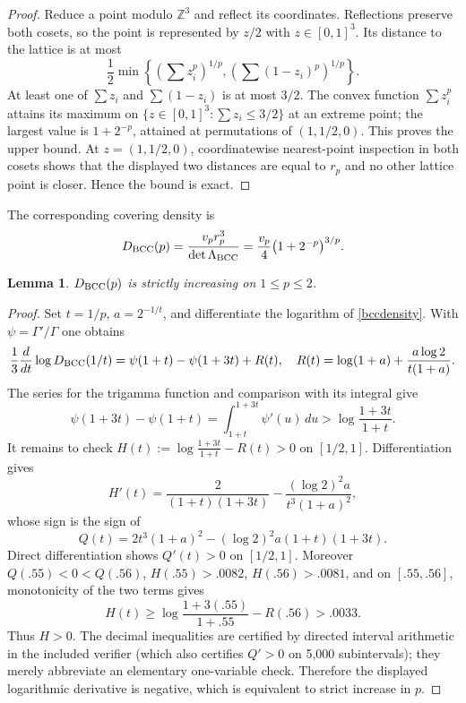 \documentclass[11pt]{article}
\newtheorem*{lemma}{Lemma}
\newcommand{\Z}{\mathbb Z}
\begin{document}
\begin{proof}
Reduce a point modulo $\Z^3$ and reflect its coordinates.  Reflections preserve
both cosets, so the point is represented by $z/2$ with $z\in[0,1]^3$.
Its distance to the lattice is at most
\[
 \frac12\min\left\{
   \left(\sum z_i^p\right)^{1/p},
   \left(\sum(1-z_i)^p\right)^{1/p}
 \right\}.
\]
At least one of $\sum z_i$ and $\sum(1-z_i)$ is at most $3/2$.
The convex function $\sum z_i^p$ attains its maximum on
$\{z\in[0,1]^3:\sum z_i\le3/2\}$ at an extreme point; the largest value is
$1+2^{-p}$, attained at permutations of $(1,1/2,0)$.  This proves the upper
bound.  At $z=(1,1/2,0)$, coordinatewise nearest-point inspection in both
cosets shows that the displayed two distances are equal to $r_p$ and no other
lattice point is closer.  Hence the bound is exact.
\end{proof}

The corresponding covering density is
\begin{equation}\label{bccdensity}
 D_{\rm BCC}(p)
 =\frac{v_pr_p^3}{\det\Lambda_{\rm BCC}}
 =\frac{v_p}{4}\bigl(1+2^{-p}\bigr)^{3/p}.
\end{equation}

\begin{lemma}
$D_{\rm BCC}(p)$ is strictly increasing on $1\le p\le2$.
\end{lemma}

\begin{proof}
Set $t=1/p$, $a=2^{-1/t}$, and differentiate the logarithm of
\eqref{bccdensity}.  With $\psi=\Gamma'/\Gamma$ one obtains
\[
 \frac13\frac{d}{dt}\log D_{\rm BCC}(1/t)
 =\psi(1+t)-\psi(1+3t)+R(t),
\quad
 R(t)=\log(1+a)+\frac{a\log2}{t(1+a)}.
\]
The series for the trigamma function and comparison with its integral give
\[
 \psi(1+3t)-\psi(1+t)
 =\int_{1+t}^{1+3t}\psi'(u)\,du
 >\log\frac{1+3t}{1+t}.
\]
It remains to check $H(t):=\log\frac{1+3t}{1+t}-R(t)>0$ on
$[1/2,1]$.  Differentiation gives
\[
 H'(t)=\frac{2}{(1+t)(1+3t)}
 -\frac{(\log2)^2a}{t^3(1+a)^2},
\]
whose sign is the sign of
\[
 Q(t)=2t^3(1+a)^2-(\log2)^2a(1+t)(1+3t).
\]
Direct differentiation shows $Q'(t)>0$ on $[1/2,1]$.
Moreover $Q(.55)<0<Q(.56)$, $H(.55)>.0082$, $H(.56)>.0081$, and on
$[.55,.56]$, monotonicity of the two terms gives
\[
 H(t)\ge
 \log\frac{1+3(.55)}{1+.55}-R(.56)>.0033.
\]
Thus $H>0$.  The decimal inequalities are certified by directed interval
arithmetic in the included verifier (which also certifies $Q'>0$ on 5,000
subintervals); they merely abbreviate an elementary one-variable check.
Therefore the displayed logarithmic derivative is negative, which is
equivalent to strict increase in $p$.
\end{proof}
\end{document}
